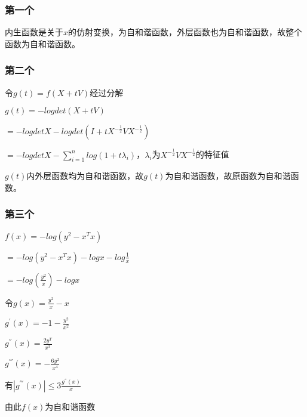\documentclass[12pt, a4paper, oneside, fontset=windows]{ctexart}
\begin{document}
\subsubsection{第一个}

内生函数是关于$x$的仿射变换，为自和谐函数，外层函数也为自和谐函数，故整个函数为自和谐函数。

\subsubsection{第二个}

令$g(t) = f(X + tV)$经过分解

$g(t) = -logdet(X + tV)$

$=-logdetX -logdet(I+tX^{-\frac{1}{2}}VX^{-\frac{1}{2}})$

$=-logdetX - \sum_{i =1}^{n} log(1 + t\lambda_i)$，$\lambda_i$为$X^{-\frac{1}{2}}VX^{-\frac{1}{2}}$的特征值

$g(t)$内外层函数均为自和谐函数，故$g(t)$为自和谐函数，故原函数为自和谐函数。
\subsubsection{第三个}
$f(x) = -log(y^2 - x^Tx)$

$= -log(y^2-x^Tx)-logx-log\frac{1}{x}$

$= -log(\frac{y^2}{x}) - logx$

令$g(x) = \frac{y^2}{x} - x$

$g^{'}(x) = - 1-\frac{y^2}{x^2}$

$g^{''}(x) = \frac{2y^T}{x^3}$

$g^{'''}(x) = -\frac{6y^2}{x^4}$

有$|g^{'''}(x)| \leq 3\frac{g^{''}(x)}{x}$

由此$f(x)$为自和谐函数
\end{document}
